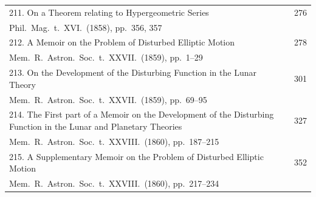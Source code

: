 \documentclass[11pt,a4paper]{book}
\begin{document}
\begin{longtable}{p{}r}
%
211. On a Theorem relating to Hypergeometric Series \dotfill & 276 \\
\multicolumn{2}{l}{\small Phil.\ Mag.\ t.~XVI.\ (1858), pp.~356, 357} \\[0.5em]
%
212. A Memoir on the Problem of Disturbed Elliptic Motion \dotfill & 278 \\
\multicolumn{2}{l}{\small Mem.\ R.\ Astron.\ Soc.\ t.~XXVII.\ (1859), pp.~1--29} \\[0.5em]
%
213. On the Development of the Disturbing Function in the Lunar Theory \dotfill & 301 \\
\multicolumn{2}{l}{\small Mem.\ R.\ Astron.\ Soc.\ t.~XXVII.\ (1859), pp.~69--95} \\[0.5em]
%
214. The First part of a Memoir on the Development of the Disturbing Function in the Lunar and Planetary Theories \dotfill & 327 \\
\multicolumn{2}{l}{\small Mem.\ R.\ Astron.\ Soc.\ t.~XXVIII.\ (1860), pp.~187--215} \\[0.5em]
%
215. A Supplementary Memoir on the Problem of Disturbed Elliptic Motion \dotfill & 352 \\
\multicolumn{2}{l}{\small Mem.\ R.\ Astron.\ Soc.\ t.~XXVIII.\ (1860), pp.~217--234} \\[0.5em]
\bottomrule
\end{longtable}

\clearpage
\end{document}
